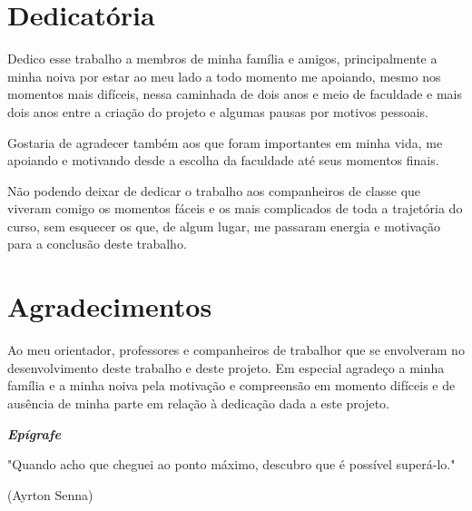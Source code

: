 \documentclass[brazil,ruledheader]{abntifes}
\begin{document}
\chapter*{Dedicatória}
    Dedico esse trabalho a membros de minha família e amigos, principalmente a minha noiva por estar ao meu lado a todo momento me apoiando, mesmo nos momentos mais difíceis, nessa caminhada de dois anos e meio de faculdade e mais dois anos entre a criação do projeto e algumas pausas por motivos pessoais.

    Gostaria de agradecer também aos que foram importantes em minha vida, me apoiando e motivando desde a escolha da faculdade até seus momentos finais.

    Não podendo deixar de dedicar o trabalho aos companheiros de classe que viveram comigo os momentos fáceis e os mais complicados de toda a trajetória do curso, sem esquecer os que, de algum lugar, me passaram energia e motivação para a conclusão deste trabalho.


\chapter*{Agradecimentos}
    Ao meu orientador, professores e companheiros de trabalhor que se envolveram no desenvolvimento deste trabalho e deste projeto. Em especial agradeço a minha família e a minha noiva pela motivação e compreensão em momento difíceis e de ausência de minha parte em relação à dedicação dada a este projeto.
\vfill
\null

\begin{center}
{\Huge {\bfseries\itshape Epígrafe}}\\[3cm]
\vspace{15cm}
\end{center}

\begin{espacoduplo}
\end{espacoduplo}

\epigraph{"Quando acho que cheguei ao ponto máximo, descubro que é possível superá-lo."}{(Ayrton Senna)}
\end{document}
